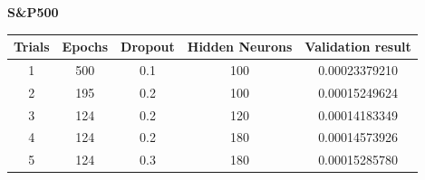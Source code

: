 \documentclass[a4paper,11pt,oneside]{book}
\begin{document}
 
 \textbf{S\&P500}


\begin{center}
	\begin{tabular}{||c c c c c||} 
		\hline
		Trials & Epochs & Dropout & Hidden Neurons & Validation result\\ [0.5ex] 
		\hline\hline
		1 & 500 & 0.1 & 100 & 0.00023379210 \\ 
		\hline
		2 & 195 & 0.2 & 100 & 0.00015249624 \\
		\hline
		3 & 124 & 0.2 & 120 & 0.00014183349 \\
		\hline
		4 & 124 & 0.2 & 180 & 0.00014573926 \\
		\hline
		5 & 124 & 0.3 & 180 & 0.00015285780 \\ [1ex] 
		\hline
	\end{tabular}
\end{center}
\end{document}
